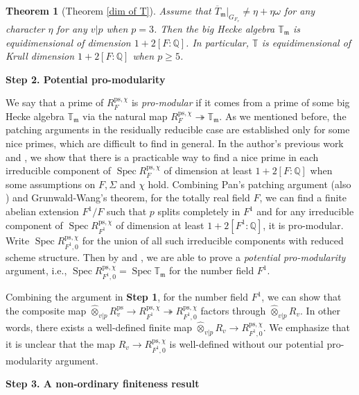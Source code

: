 \documentclass[a4paper, 12pt]{amsart}
\newtheorem{thm}{Theorem}[subsection]
\DeclareMathOperator{\Spec}{Spec}
\def\ps{\mathrm{ps}}
\newcommand{\Q}{\mathbb{Q}}
\newcommand{\T}{\mathbb{T}}
\newcommand{\km}{\mathfrak{m}}
\begin{document}
	\begin{thm}[Theorem \ref{dim of T}]\label{main T}
		Assume that $\overline{T}_\km|_{G_{F_v}} \ne \eta+\eta\omega$ for any character $\eta$ for any $v|p$ when $p=3$. Then the big Hecke algebra $\T_{\km} $ is equidimensional of dimension $1+2[F:\Q] $. In particular, $\T$ is equidimensional of Krull dimension $1+2[F:\Q] $ when $p \ge 5$. 
	\end{thm}
	
    \textbf{Step 2. Potential pro-modularity}
    
    We say that a prime of $ R_F^{\ps, \chi}$ is \textit{pro-modular} if it comes from a prime of some big Hecke algebra $\T_{\km} $ via the natural map $R_F^{\ps, \chi} \twoheadrightarrow \T_{\km} $. As we mentioned before, the patching arguments in the residually reducible case are established only for some nice primes, which are difficult to find in general. In the author's previous work \cite{Zhang:2024ab} and \cite{Zhang:2024aa},  we show that there is a practicable way to find a nice prime in each irreducible component of $\Spec R_F^{\ps, \chi}$ of dimension at least $1+2[F:\Q]$ when some assumptions on $F, \Sigma$ and $\chi$ hold. Combining Pan's patching argument \cite[Theorem 4.1.4]{pan2022fontaine} (also \cite[Theorem 4.1.4]{Zhang:2024aa}) and Grunwald-Wang's theorem, for the totally real field $F$, we can find a finite abelian extension $F^1/F$ such that $p$ splits completely in $F^1$ and for any irreducible component of $\Spec R_{F^1}^{\ps, \chi} $ of dimension at least $1+2[F^1: \Q]$, it is pro-modular. Write $\Spec R_{F^1, 0}^{\ps, \chi} $ for the union of all such irreducible components with reduced scheme structure. Then by \cite[Theorem 3.6.1]{pan2022fontaine} and \cite[Corollary 3.3.10]{Zhang:2024aa}, we are able to prove a \textit{potential pro-modularity} argument, i.e., $\Spec R_{F^1, 0}^{\ps, \chi} = \Spec \T_{\km} $ for the number field $F^1$.
    
    Combining the argument in \textbf{Step 1}, for the number field $F^1$, we can show that the composite map $ \widehat{\otimes}_{v|p} R_v^\ps \to R_{F^1}^{\ps, \chi} \twoheadrightarrow R_{F^1, 0}^{\ps, \chi}$ factors through $\widehat{\otimes}_{v|p} R_v $. In other words, there exists a well-defined finite map $\widehat{\otimes}_{v|p} R_v \to R_{F^1, 0}^{\ps, \chi} $. We emphasize that it is unclear that the map $R_v \to R_{F^1, 0}^{\ps, \chi}$ is well-defined without our potential pro-modularity argument.
	
	\textbf{Step 3. A non-ordinary finiteness result}
	
\end{document}
